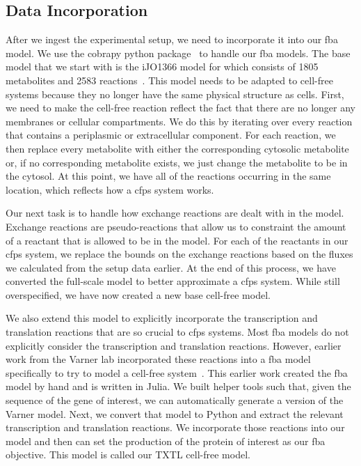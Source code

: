 \subsection{Data Incorporation} \label{sec:incorp}
After we ingest the experimental setup, we need to incorporate it into our \gls{fba} model.
We use the \gls{cobra}py python package~\cite{ebrahim2013cobrapy} to handle our \gls{fba} models.
The base model that we start with is the iJO1366 model for \ecoli which consists of 1805 metabolites and 2583 reactions~\cite{orth2011comprehensive}.
This model needs to be adapted to cell-free systems because they no longer have the same physical structure as \ecoli cells.
First, we need to make the cell-free reaction reflect the fact that there are no longer any membranes or cellular compartments.
We do this by iterating over every reaction that contains a periplasmic or extracellular component.
For each reaction, we then replace every metabolite with either the corresponding cytosolic metabolite or, if no corresponding metabolite exists, we just change the metabolite to be in the cytosol.
At this point, we have all of the reactions occurring in the same location, which reflects how a \gls{cfps} system works.

Our next task is to handle how exchange reactions are dealt with in the model.
Exchange reactions are pseudo-reactions that allow us to constraint the amount of a reactant that is allowed to be in the model.
For each of the reactants in our \gls{cfps} system, we replace the bounds on the exchange reactions based on the fluxes we calculated from the setup data earlier.
At the end of this process, we have converted the full-scale \ecoli model to better approximate a \gls{cfps} system.
While still overspecified, we have now created a new base cell-free model.

We also extend this model to explicitly incorporate the transcription and translation reactions that are so crucial to \gls{cfps} systems.
Most \gls{fba} models do not explicitly consider the transcription and translation reactions.
However, earlier work from the Varner lab incorporated these reactions into a \gls{fba} model specifically to try to model a cell-free system~\cite{vilkhovoy2017sequence}.
This earlier work created the \gls{fba} model by hand and is written in Julia.
We built helper tools such that, given the sequence of the gene of interest, we can automatically generate a version of the Varner model.
Next, we convert that model to Python and extract the relevant transcription and translation reactions.
We incorporate those reactions into our model and then can set the production of the protein of interest as our \gls{fba} objective.
This model is called our TXTL cell-free model.

